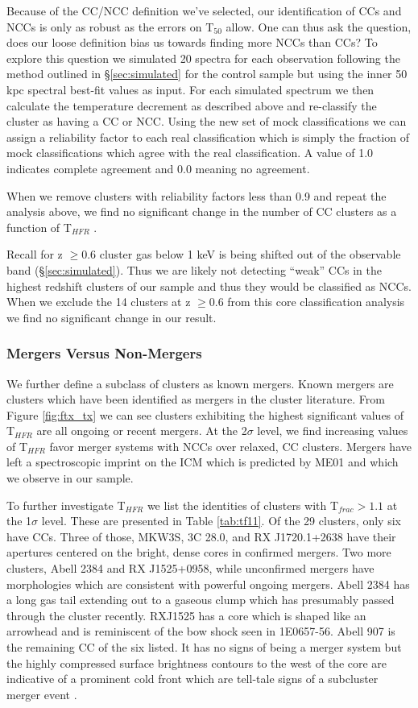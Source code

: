 \documentclass{emulateapj}
\newcommand{\tf}{T$_{HFR}$ }
\begin{document}
Because of the CC/NCC definition we've selected, our identification of
CCs and NCCs is only as robust as the errors on T$_{50}$ allow. One can
thus ask the question, does our loose definition bias us towards
finding more NCCs than CCs? To explore this question we simulated 20
spectra for each observation following the method outlined in
\S\ref{sec:simulated} for the control sample but using the inner 50
kpc spectral best-fit values as input. For each simulated spectrum we
then calculate the temperature decrement as described above and
re-classify the cluster as having a CC or NCC. Using the new set of
mock classifications we can assign a reliability factor to each real
classification which is simply the fraction of mock classifications
which agree with the real classification. A value of 1.0 indicates
complete agreement and 0.0 meaning no agreement.

When we remove clusters with reliability factors less than 0.9 and
repeat the analysis above, we find no significant change in the number
of CC clusters as a function of \tf.

Recall for z $\geq 0.6$ cluster gas below 1 keV is being shifted out
of the observable band (\S\ref{sec:simulated}). Thus we are likely not
detecting ``weak'' CCs in the highest redshift clusters of our
sample and thus they would be classified as NCCs. When we exclude
the 14 clusters at z $\geq 0.6$ from this core classification analysis
we find no significant change in our result.

\subsubsection{Mergers Versus Non-Mergers}\label{sec:merge}

We further define a subclass of clusters as known mergers. Known
mergers are clusters which have been identified as mergers in the
cluster literature. From Figure \ref{fig:ftx_tx} we can see clusters
exhibiting the highest significant values of \tf are all ongoing or
recent mergers. At the 2$\sigma$ level, we find increasing values of
\tf favor merger systems with NCCs over relaxed, CC clusters. Mergers
have left a spectroscopic imprint on the ICM which is predicted by
ME01 and which we observe in our sample.

To further investigate \tf we list the identities of 
clusters with T$_{frac} > 1.1$ at the 1$\sigma$ level. These are
presented in Table \ref{tab:tf11}. Of the 29 clusters, only six have
CCs. Three of those, MKW3S, 3C 28.0, and RX J1720.1+2638 have their
apertures centered on the bright, dense cores in confirmed
mergers. Two more clusters, Abell 2384 and RX J1525+0958, while
unconfirmed mergers have morphologies which are consistent with
powerful ongoing mergers. Abell 2384 has a long gas tail extending out
to a gaseous clump which has presumably passed through the cluster
recently. RXJ1525 has a core which is shaped like an arrowhead and is
reminiscent of the bow shock seen in 1E0657-56. Abell 907 is the
remaining CC of the six listed. It has no signs of being a merger
system but the highly compressed surface brightness contours to the
west of the core are indicative of a prominent cold
front which are tell-tale signs of a subcluster merger event
\citep{2007PhR...443....1M}.
\end{document}
